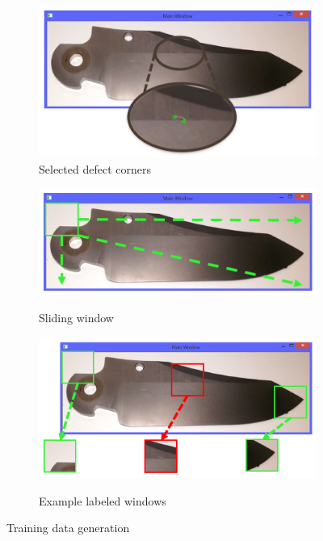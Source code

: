 \documentclass[letterpaper, 10 pt, conference]{ieeeconf}  %
\begin{document}
\begin{figure}
    \centering
    \begin{subfigure}[b]{.32\textwidth}
        \centering
        \includegraphics[width=.9\textwidth]{defect_location.png}
        \caption{Selected defect corners}
        \vspace*{2mm}
        \label{fig:defect corners}
    \end{subfigure}
    \hfill
    \begin{subfigure}[b]{.32\textwidth}
        \centering
        \raisebox{8.2mm}
        {\includegraphics[width=.9\textwidth]{defect_sliding_window.png}}
        \caption{Sliding window}
        \vspace*{2mm}
        \label{fig:sliding window}
    \end{subfigure}
    \hfill
    \begin{subfigure}[b]{.32\textwidth}
        \centering
        \raisebox{1.7mm}
        {\includegraphics[width=.9\textwidth]{defect_windows.png}}
        \caption{Example labeled windows}
        \vspace*{2mm}
        \label{fig:labeled windows}
    \end{subfigure}
    \caption{Training data generation}
    \label{fig:data generation}
\end{figure}
\end{document}
